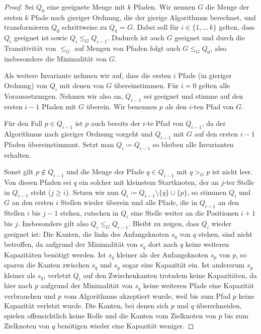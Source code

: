 \begin{proof}
    Sei $Q_0$ eine geeignete Menge mit $k$ Pfaden.
    Wir nennen $G$ die Menge der ersten $k$ Pfade nach gieriger Ordnung, die der gierige Algorithmus berechnet, und
    transformieren $Q_0$ schrittweise zu $Q_k = G$.
    Dabei soll für $i \in \{1,\dots\,k\}$ gelten, dass $Q_i$ geeignet ist sowie $Q_i \leq_G Q_{i-1}$.
    Dadurch ist auch $G$ geeignet und durch die Transitivität von $\leq_G$ auf Mengen von Pfaden folgt auch $G \leq_G Q_0$,
    also insbesondere die Minimalität von $G$.

    Als weitere Invariante nehmen wir auf, dass die ersten $i$ Pfade (in gieriger Ordnung) von $Q_i$ mit denen von $G$
    übereinstimmen.
    Für $i=0$ gelten alle Voraussetzungen.
    Nehmen wir also an, $Q_{i-1}$ sei geeignet und stimme auf den ersten $i-1$ Pfaden mit $G$ überein.
    Wir benennen $p$ als den $i$-ten Pfad von $G$.

    Für den Fall $p \in Q_{i-1}$ ist $p$ auch bereits der $i$-te Pfad von $Q_{i-1}$, da der Algorithmus nach
    gieriger Ordnung vorgeht und $Q_{i-1}$ mit $G$ auf den ersten $i-1$ Pfaden übereinstimmmt.
    Setzt man $Q_i \coloneqq Q_{i-1}$ so bleiben alle Invarianten erhalten.

    Sonst gilt $p \notin Q_{i-1}$ und die Menge der Pfade $q \in Q_{i-1}$ mit $q >_G p$ ist nicht leer.
    Von diesen Pfaden sei $q$ ein solcher mit kleinstem Startknoten, der an $j$-ter Stelle in $Q_{i-1}$ steht
    ($j \geq i$).
    Setzen wir nun $Q_{i} \coloneqq Q_{i-1} \setminus \{ q \} \cup \{ p \}$, so stimmen $Q_{i}$ und $G$ an den
    ersten $i$ Stellen wieder überein und alle Pfade, die in $Q_{i-1}$ an den Stellen $i$ bis $j-1$ stehen, rutschen
    in $Q_i$ eine Stelle weiter an die Positionen $i+1$ bis $j$.
    Insbesondere gilt also $Q_i \leq_G Q_{i-1}$.
    Bleibt zu zeigen, dass $Q_i$ wieder geeignet ist:
    Die Kanten, die links des Anfangsknoten $s_q$ von $q$ stehen, sind nicht betroffen, da aufgrund der Minimalität
    von $s_q$ dort nach $q$ keine weiteren Kapazitäten benötigt werden.
    Ist $s_q$ kleiner als der Anfangsknoten $s_p$ von $p$, so sparen die Kanten zwischen $s_q$ und $s_p$ sogar eine
    Kapazität ein.
    Ist andersrum $s_p$ kleiner als $s_q$, verletzt $Q_i$ auf den Zwischenkanten trotzdem keine Kapazitäten, da
    hier nach $p$ aufgrund der Minimalität von $s_q$ keine weiteren Pfade eine Kapazität verbrauchen und $p$ vom
    Algorithmus akzeptiert wurde, weil bis zum Pfad $p$ keine Kapazität verletzt wurde.
    Die Kanten, bei denen sich $p$ und $q$ überschneiden, spielen offensichtlich keine Rolle und die Kanten
    vom Zielknoten von $p$ bis zum Zielknoten von $q$ benötigen wieder eine Kapazität weniger.
\end{proof}

